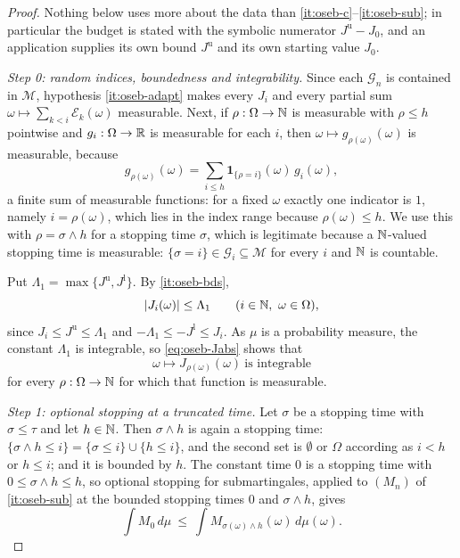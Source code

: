 \begin{proof}
Nothing below uses more about the data than \ref{it:oseb-c}--\ref{it:oseb-sub};
in particular the budget is stated with the symbolic numerator
$J^{\mathrm u}-J_0$, and an application supplies its own bound
$J^{\mathrm u}$ and its own starting value $J_0$.

\emph{Step 0: random indices, boundedness and integrability.} Since each
$\mathcal G_n$ is contained in $\mathcal M$, hypothesis
\ref{it:oseb-adapt} makes every $J_i$ and every partial sum
$\omega\mapsto\sum_{k<i}\mathcal E_k(\omega)$ measurable. Next, if
$\rho:\Omega\to\mathbb{N}$ is measurable with $\rho\le h$ pointwise and
$g_i:\Omega\to\mathbb{R}$ is measurable for each $i$, then
$\omega\mapsto g_{\rho(\omega)}(\omega)$ is measurable, because
\[
  g_{\rho(\omega)}(\omega)
   =\sum_{i\le h}\mathbf 1_{\{\rho=i\}}(\omega)\,g_i(\omega),
\]
a finite sum of measurable functions: for a fixed $\omega$ exactly one
indicator is $1$, namely $i=\rho(\omega)$, which lies in the index range
because $\rho(\omega)\le h$. We use this with $\rho=\sigma\wedge h$ for a
stopping time $\sigma$, which is legitimate because a $\mathbb{N}$-valued stopping time
is measurable: $\{\sigma=i\}\in\mathcal G_i\subseteq\mathcal M$ for every $i$
and $\mathbb{N}$ is countable.

Put $\Lambda_1=\max\{J^{\mathrm u},J^{\mathrm l}\}$. By \ref{it:oseb-bds},
\begin{equation}\label{eq:oseb-Jabs}
  |J_i(\omega)|\le\Lambda_1\qquad(i\in\mathbb{N},\ \omega\in\Omega),
\end{equation}
since $J_i\le J^{\mathrm u}\le\Lambda_1$ and
$-\Lambda_1\le-J^{\mathrm l}\le J_i$. As $\mu$ is a probability measure, the
constant $\Lambda_1$ is integrable, so \eqref{eq:oseb-Jabs} shows that
\begin{equation}\label{eq:oseb-Jint}
  \omega\mapsto J_{\rho(\omega)}(\omega)\ \text{is integrable}
\end{equation}
for every $\rho:\Omega\to\mathbb{N}$ for which that function is measurable.

\emph{Step 1: optional stopping at a truncated time.} Let $\sigma$ be a
stopping time with $\sigma\le\tau$ and let $h\in\mathbb{N}$. Then $\sigma\wedge h$ is
again a stopping time: $\{\sigma\wedge h\le i\}=\{\sigma\le i\}\cup\{h\le i\}$,
and the second set is $\emptyset$ or $\Omega$ according as $i<h$ or $h\le i$;
and it is bounded by $h$. The constant time $0$ is a stopping time with
$0\le\sigma\wedge h\le h$, so optional stopping for submartingales, applied to
$(M_n)$ of \ref{it:oseb-sub} at the bounded stopping times $0$ and
$\sigma\wedge h$, gives
\begin{equation}\label{eq:oseb-os}
  \int M_0\,d\mu\ \le\ \int M_{\sigma(\omega)\wedge h}(\omega)\,d\mu(\omega).
\end{equation}


\end{proof}
